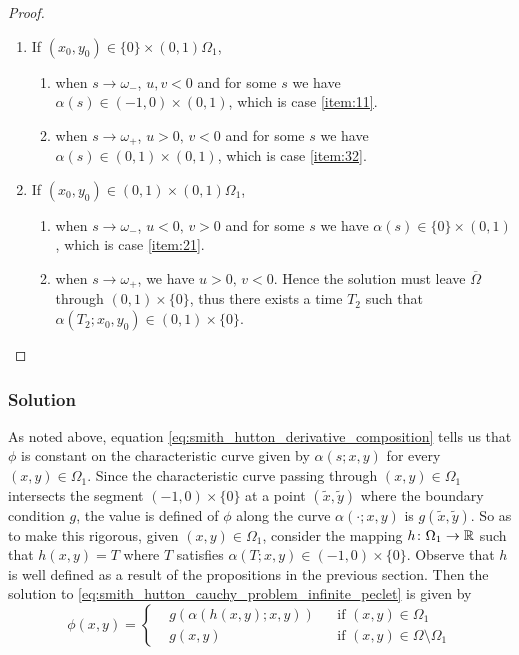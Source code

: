 \begin{proof}
\begin{enumerate}[label={(\arabic*)}, topsep=0pt]
		\item If $(x_0,y_0) \in \{ 0 \} \times (0,1) \Omega_1$,
		\begin{enumerate}[label={(2.\arabic*)}, topsep=0pt]
			\item when $s \to \omega_{-}$, $u, v < 0$
			and for some $s$ we have $\alpha(s) \in (-1,0) \times (0,1)$, which is case \ref{item:11}. \label{item:21}
			\item when $s \to \omega_{+}$, $u > 0, \, v < 0$
			and for some $s$ we have $\alpha(s) \in (0,1) \times (0,1)$, which is case \ref{item:32}.
		\end{enumerate}

		\item If $(x_0,y_0) \in (0,1) \times (0,1) \Omega_1$,
		\begin{enumerate}[label={(3.\arabic*)}, topsep=0pt]
			\item when $s \to \omega_{-}$, $u < 0, \, v > 0$
			and for some $s$ we have $\alpha(s) \in \{ 0 \} \times (0,1)$, which is case \ref{item:21}. \label{item:31}
			\item when $s \to \omega_{+}$, we have $u > 0, \,
			v < 0$. Hence the solution must leave $\overline{\Omega}$ through
			$(0,1) \times \{ 0 \}$, thus there exists a time $T_2$ such that
			$\alpha(T_2;x_0,y_0) \in (0,1) \times \{ 0 \}$.  \label{item:32}
		\end{enumerate}

	\end{enumerate}

\end{proof}

\subsubsection*{Solution}

As noted above, equation \eqref{eq:smith_hutton_derivative_composition} tells us
that $\phi$ is constant on the characteristic curve given by $\alpha(s;x,y)$ for
every $(x,y) \in \Omega_1$. Since the characteristic curve passing through
$(x,y) \in \Omega_1$ intersects the segment $(-1,0) \times \{ 0 \}$ at a point
$(\tilde{x}, \tilde{y})$ where the boundary condition $g$, the value is defined
of $\phi$ along the curve $\alpha(\cdot;x,y)$ is $g(\tilde{x}, \tilde{y})$. So
as to make this rigorous, given $(x,y) \in \Omega_1$, consider the mapping $h
\colon \Omega_1 \rightarrow \mathbb{R}$ such that $h(x,y) = T$ where $T$ satisfies
$\alpha(T;x,y) \in (-1,0) \times \{ 0 \}$. Observe that $h$ is well defined as a
result of the propositions in the previous section. Then the solution to
\eqref{eq:smith_hutton_cauchy_problem_infinite_peclet} is given by
\begin{equation} \label{eq:smith_hutton_infinite_peclet_solution}
	\phi(x,y) = 
	\left\{
		\begin{aligned}
			&g(\alpha(h(x,y);x,y)) 	& &\text{if } (x,y) \in \Omega_1					\\
			&g(x,y)					& &\text{if } (x,y) \in \Omega \setminus \Omega_1
		\end{aligned}
	\right.
\end{equation}

